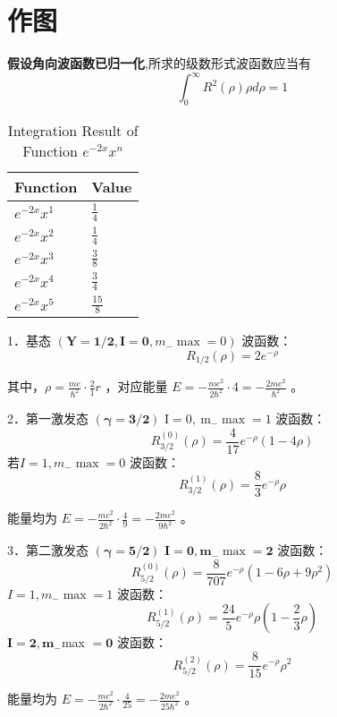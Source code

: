 \documentclass[12pt]{ctexart}
\begin{document}
\section{作图}
\textbf{假设角向波函数已归一化},所求的级数形式波函数应当有$$\int_{0}^{\infty}R^2(\rho)\rho d\rho=1$$
\begin{table}[H]
    \centering
    \caption{Integration Result of Function $e^{-2x}x^n$}
    \begin{tabular}{|l|l|} 
    \hline
    Function           & Value                            \\ 
    \hline
    $e^{-2x}x^{1}$ & $\frac{1}{4}$   \\
   $ e^{-2x}x^{2}$ & $\frac{1}{4} $  \\
   $ e^{-2x}x^{3} $& $\frac{3}{8} $  \\
    $e^{-2x}x^{4} $ & $\frac{3}{4} $  \\
   $ e^{-2x}x^{5}$ & $\frac{15}{8} $ \\
    \hline
    \end{tabular}
    \end{table}
1．基态 $\left(\boldsymbol{Y}=\mathbf{1 / 2}, \mathbf{I}=\mathbf{0}, m_{-} \max =0\right)$
波函数：
$$
R_{1 / 2}(\rho)=2e^{-\rho}
$$

其中，$\rho=\frac{m e}{\hbar^2} \cdot \frac{2}{1} r$ ，对应能量 $E=-\frac{m e^2}{2 \hbar^2} \cdot 4=-\frac{2 m e^2}{\hbar^2}$ 。

2．第一激发态 $(\boldsymbol{\gamma}=\mathbf{3 / 2})$
$\mathrm{I}=0, \mathrm{~m}_{-} \max =1$
波函数：
$$
R_{3 / 2}^{(0)}(\rho)=\frac{4}{17} e^{-\rho}(1-4 \rho)
$$
若$I=1, m_{-} \max =0$
波函数：
$$
R_{3 / 2}^{(1)}(\rho)=\frac{8}{3} e^{-\rho} \rho
$$

能量均为 $E=-\frac{m e^2}{2 \hbar^2} \cdot \frac{4}{9}=-\frac{2 m e^2}{9 \hbar^2}$ 。

3．第二激发态 $(\boldsymbol{\gamma}=\mathbf{5 / 2})$
 $\mathbf{I}=\mathbf{0}, \mathbf{m}_{-} \max =\mathbf{2}$
波函数：
$$
R_{5 / 2}^{(0)}(\rho)=\frac{8}{707} e^{-\rho}\left(1-6 \rho+9 \rho^2\right)
$$
$I=1, m_{-} \max =1$
波函数：
$$
R_{5 / 2}^{(1)}(\rho)=\frac{24}{5} e^{-\rho} \rho\left(1-\frac{2}{3} \rho\right)
$$
 $\mathbf{I}=\mathbf{2}, \mathbf{m}_{-}$max $=\mathbf{0}$
波函数：
$$
R_{5 / 2}^{(2)}(\rho)=\frac{8}{15} e^{-\rho} \rho^2
$$

能量均为 $E=-\frac{m e^2}{2 \hbar^2} \cdot \frac{4}{25}=-\frac{2 m e^2}{25 \hbar^2}$ 。
\end{document}
